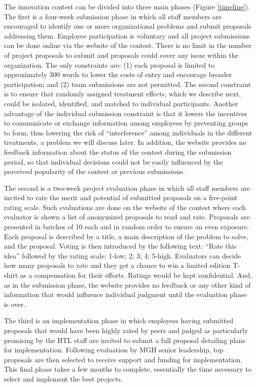 \documentclass[11pt, titlepage]{article}
\begin{document}
The innovation contest can be divided into three main phases (Figure
\ref{timeline}). The first is a four-week submission phase in which all
staff members are encouraged to identify one or more organizational
problems and submit proposals addressing them. Employee participation is
voluntary and all project submissions can be done online via the website
of the contest. There is no limit in the number of project proposals to
submit and proposals could cover any issue within the organization. The
only constraints are: (1) each proposal is limited to approximately 300
words to lower the costs of entry and encourage broader participation;
and (2) team submissions are not permitted. The second constraint is to
ensure that randomly assigned treatment effects, which we describe next,
could be isolated, identified, and matched to individual participants.
Another advantage of the individual submission constraint is that it
lowers the incentives to communicate or exchange information among
employees by preventing groups to form, thus lowering the risk of
``interference'' among individuals in the different treatments, a
problem we will discuss later. In addition, the website provides no
feedback information about the status of the contest during the
submission period, so that individual decisions could not be easily
influenced by the perceived popularity of the contest or previous
submissions.

The second is a two-week project evaluation phase in which all staff
members are invited to rate the merit and potential of submitted
proposals on a five-point rating scale. Such evaluations are done on the
website of the contest where each evaluator is shown a list of
anonymized proposals to read and rate. Proposals are presented in
batches of 10 each and in random order to ensure an even exposure. Each
proposal is described by a title, a main description of the problem to
solve, and the proposal. Voting is then introduced by the following
text: ``Rate this idea'' followed by the rating scale: 1-low; 2; 3; 4;
5-high. Evaluators can decide how many proposals to rate and they get a
chance to win a limited edition T-shirt as a compensation for their
efforts. Ratings would be kept confidential. And, as in the submission
phase, the website provides no feedback or any other kind of information
that would influence individual judgment until the evaluation phase is
over.

The third is an implementation phase in which employees having submitted
proposals that would have been highly rated by peers and judged as
particularly promising by the HTL staff are invited to submit a full
proposal detailing plans for implementation. Following evaluation by MGH
senior leadership, top proposals are then selected to receive support
and funding for implementation. This final phase takes a few months to
complete, essentially the time necessary to select and implement the
best projects.
\end{document}
